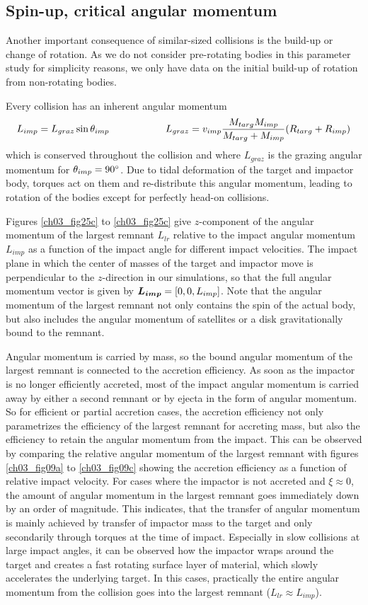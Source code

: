 \subsection{Spin-up, critical angular momentum}
Another important consequence of similar-sized collisions is the build-up or change of rotation. As we do not consider pre-rotating bodies in this parameter study for simplicity reasons, we only have data on the initial build-up of rotation from non-rotating bodies.

Every collision has an inherent angular momentum 
\begin{align}
L_{imp} = L_{graz} \sin{ \theta_{imp}} \hspace{2.0cm} L_{graz} = v_{imp} \frac{M_{targ} M_{imp}}{M_{targ} + M_{imp}} (R_{targ} + R_{imp})
\end{align}
which is conserved throughout the collision and where $L_{graz}$ is the grazing angular momentum for $\theta_{imp} = 90 ^\circ$. Due to tidal deformation of the target and impactor body, torques act on them and re-distribute this angular momentum, leading to rotation of the bodies except for perfectly head-on collisions.

Figures \ref{ch03_fig25c} to \ref{ch03_fig25c} give $z$-component of the angular momentum of the largest remnant $L_{lr}$ relative to the impact angular momentum $L_{imp}$ as a function of the impact angle for different impact velocities. The impact plane in which the center of masses of the target and impactor move is perpendicular to the $z$-direction in our simulations, so that the full angular momentum vector is given by $\boldsymbol{L_{imp}} = [0, 0, L_{imp} ]$. Note that the angular momentum of the largest remnant not only contains the spin of the actual body, but also includes the angular momentum of satellites or a disk gravitationally bound to the remnant.

Angular momentum is carried by mass, so the bound angular momentum of the largest remnant is connected to the accretion efficiency. As soon as the impactor is no longer efficiently accreted, most of the impact angular momentum is carried away by either a second remnant or by ejecta in the form of angular momentum. So for efficient or partial accretion cases, the accretion efficiency not only parametrizes the efficiency of the largest remnant for accreting mass, but also the efficiency to retain the angular momentum from the impact. This can be observed by comparing the relative angular momentum of the largest remnant with figures \ref{ch03_fig09a} to \ref{ch03_fig09c} showing the accretion efficiency as a function of relative impact velocity. For cases where the impactor is not accreted and $\xi \approx 0$, the amount of angular momentum in the largest remnant goes immediately down by an order of magnitude. This indicates, that the transfer of angular momentum is mainly achieved by transfer of impactor mass to the target and only secondarily through torques at the time of impact. Especially in slow collisions at large impact angles, it can be observed how the impactor wraps around the target and creates a fast rotating surface layer of material, which slowly accelerates the underlying target. In this cases, practically the entire angular momentum from the collision goes into the largest remnant ($L_{lr} \approx L_{imp}$).

